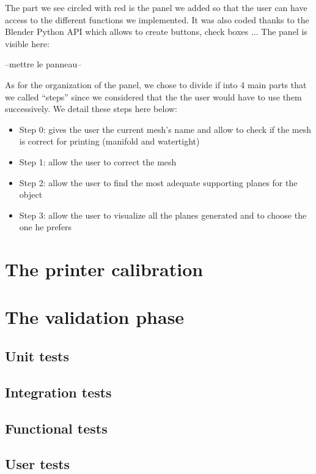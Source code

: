 \documentclass{report}
\begin{document}
The part we see circled with red is the panel we added so that the user can have access to the different functions we implemented. It was also coded thanks to the Blender Python API which allows to create buttons, check boxes ... The panel is visible here:

\bigskip
--mettre le panneau--
\bigskip

As for the organization of the panel, we chose to divide if into 4 main parts that we called ``steps'' since we considered that the the user would have to use them successively. We detail these steps here below:

\begin{itemize}
\item Step 0: gives the user the current mesh's name and allow to check if the mesh is correct for printing (manifold and watertight)
\item Step 1: allow the user to correct the mesh
\item Step 2: allow the user to find the most adequate supporting planes for the object
\item Step 3: allow the user to visualize all the planes generated and to choose the one he prefers
\end{itemize}

\chapter{The printer calibration}

\chapter{The validation phase}

\section{Unit tests}

\section{Integration tests}

\section{Functional tests}

\section{User tests}


\appendix
\end{document}
